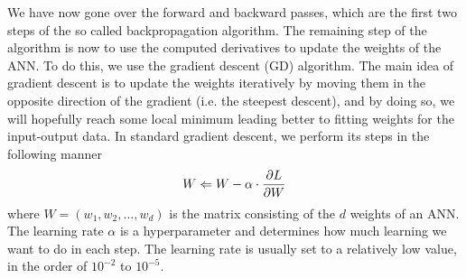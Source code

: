 We have now gone over the forward and backward passes, which are the first two steps of the so called backpropagation algorithm. The remaining step of the algorithm is now to use the computed derivatives to update the weights of the ANN. To do this, we use the gradient descent (GD) algorithm. The main idea of gradient descent is to update the weights iteratively by moving them in the opposite direction of the gradient (i.e. the steepest descent), and by doing so, we will hopefully reach some local minimum leading better to fitting weights for the input-output data. In standard gradient descent, we perform its steps in the following manner
\begin{align}
    W \Leftarrow W - \alpha \cdot \frac{\partial L}{\partial W}
\end{align}
where $W = \left( w_1, w_2, \ldots, w_d \right)$ is the matrix consisting of the $d$ weights of an ANN. The learning rate $\alpha$ is a hyperparameter and determines how much learning we want to do in each step. The learning rate is usually set to a relatively low value, in the order of $10^{-2}$ to $10^{-5}$.

